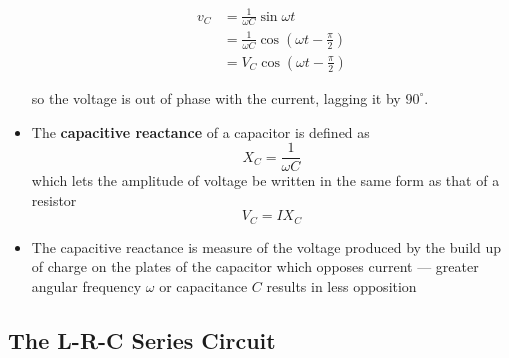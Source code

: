\documentclass{article}
\begin{document}
\begin{itemize}
        \begin{align*}
          v_C & = \frac{1}{\omega C} \sin \omega t                                \\
              & = \frac{1}{\omega C} \cos \left( \omega t - \frac{\pi}{2} \right) \\
              & = V_C \cos \left( \omega t - \frac{\pi}{2} \right)
        \end{align*}

        so the voltage is out of phase with the current, lagging it by $90^{\circ}$.

  \item The \textbf{capacitive reactance} of a capacitor is defined as \[X_C = \frac{1}{\omega C}\] which lets the amplitude of voltage be written in the same form as that of a resistor \[V_C = I X_C\]

  \item The capacitive reactance is measure of the voltage produced by the build up of charge on the plates of the capacitor which opposes current — greater angular frequency $\omega$ or capacitance $C$ results in less opposition
\end{itemize}

\subsection{The L-R-C Series Circuit}
\end{document}
